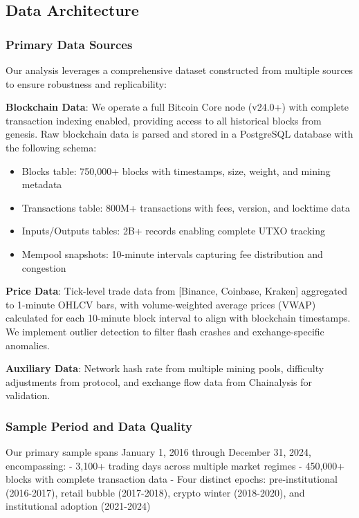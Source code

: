 \documentclass[
  12pt,
  letterpaper,
  DIV=11,
  numbers=noendperiod]{scrartcl}
\providecommand{\tightlist}{%
  \setlength{\itemsep}{0pt}\setlength{\parskip}{0pt}}
\begin{document}
\subsection{Data Architecture}\label{data-architecture}

\subsubsection{Primary Data Sources}\label{primary-data-sources}

Our analysis leverages a comprehensive dataset constructed from multiple
sources to ensure robustness and replicability:

\textbf{Blockchain Data}: We operate a full Bitcoin Core node (v24.0+)
with complete transaction indexing enabled, providing access to all
historical blocks from genesis. Raw blockchain data is parsed and stored
in a PostgreSQL database with the following schema:

\begin{itemize}
\tightlist
\item
  Blocks table: 750,000+ blocks with timestamps, size, weight, and
  mining metadata
\item
  Transactions table: 800M+ transactions with fees, version, and
  locktime data\\
\item
  Inputs/Outputs tables: 2B+ records enabling complete UTXO tracking
\item
  Mempool snapshots: 10-minute intervals capturing fee distribution and
  congestion
\end{itemize}

\textbf{Price Data}: Tick-level trade data from {[}Binance, Coinbase,
Kraken{]} aggregated to 1-minute OHLCV bars, with volume-weighted
average prices (VWAP) calculated for each 10-minute block interval to
align with blockchain timestamps. We implement outlier detection to
filter flash crashes and exchange-specific anomalies.

\textbf{Auxiliary Data}: Network hash rate from multiple mining pools,
difficulty adjustments from protocol, and exchange flow data from
Chainalysis for validation.

\subsubsection{Sample Period and Data
Quality}\label{sample-period-and-data-quality}

Our primary sample spans January 1, 2016 through December 31, 2024,
encompassing: - 3,100+ trading days across multiple market regimes -
450,000+ blocks with complete transaction data - Four distinct epochs:
pre-institutional (2016-2017), retail bubble (2017-2018), crypto winter
(2018-2020), and institutional adoption (2021-2024)
\end{document}
